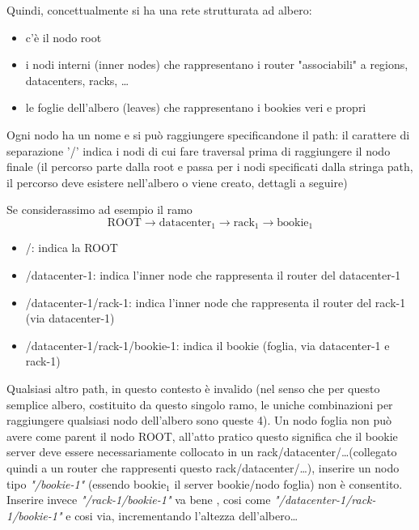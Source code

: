 \documentclass[10pt, a4paper]{article}
\begin{document}
	Quindi, concettualmente si ha una rete strutturata ad albero: 
	\begin{itemize}
		\item c'è il nodo root
		\item i nodi interni (inner nodes) che rappresentano i router "associabili" a regions, datacenters, racks, \dots
		\item le foglie dell'albero (leaves) che rappresentano i bookies veri e propri
	\end{itemize}

	Ogni nodo ha un nome e si può raggiungere specificandone il path: il carattere di separazione '/' indica i nodi di cui fare traversal prima
	di raggiungere il nodo finale (il percorso parte dalla root e passa per i nodi specificati dalla stringa path, il percorso deve esistere nell'albero o viene creato, dettagli a seguire)

	Se considerassimo ad esempio il ramo 
	$$ \text{ROOT} \rightarrow \text{datacenter}_1 \rightarrow \text{rack}_1 \rightarrow \text{bookie}_1$$

	\begin{itemize}	
		\item /: indica la ROOT
		\item /datacenter-1: indica l'inner node che rappresenta il router del datacenter-1
		\item /datacenter-1/rack-1: indica l'inner node che rappresenta il router del rack-1 (via datacenter-1)
		\item /datacenter-1/rack-1/bookie-1: indica il bookie (foglia, via datacenter-1 e rack-1)
	\end{itemize}
	
	Qualsiasi altro path, in questo contesto è invalido (nel senso che per questo semplice albero, costituito da questo singolo ramo,
	le uniche combinazioni per raggiungere qualsiasi nodo dell'albero sono queste 4).
	Un nodo foglia non può avere come parent il nodo ROOT, all'atto pratico questo significa che il bookie server deve essere necessariamente
	collocato in un rack/datacenter/\dots (collegato quindi a un router che rappresenti questo rack/datacenter/\dots), inserire un nodo tipo
	\textit{"/bookie-1"} (essendo bookie$_1$ il server bookie/nodo foglia) non è consentito. Inserire invece \textit{"/rack-1/bookie-1"} va bene
	, cosi come \textit{"/datacenter-1/rack-1/bookie-1"} e cosi via, incrementando l'altezza dell'albero\dots
\end{document}
